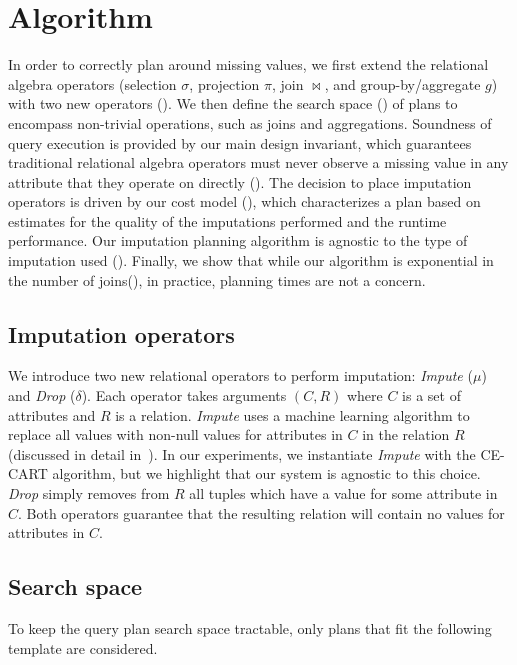\section{Algorithm}
In order to correctly plan around missing values, we first extend the relational algebra operators (selection $\sigma$, projection $\pi$, join $\bowtie$, and group-by/aggregate $g$) 
with two new operators (). We then define the search space () of plans to encompass non-trivial operations, such as joins and 
aggregations. Soundness of query execution is provided by our main design invariant, which guarantees traditional relational
algebra operators must never observe a missing value in any attribute that they operate on directly (). 
The decision to place imputation operators is driven by our cost model (), which characterizes a plan based on estimates for the 
quality of the imputations performed and the runtime performance. Our imputation planning algorithm is
agnostic to the type of imputation used (). Finally, we show
that while our algorithm is exponential in the number of joins(), in practice, planning times are not a concern.


\subsection{Imputation operators}
\label{sec:operators}
We introduce two new relational operators to perform imputation: \textit{Impute} ($\mu$) and
\textit{Drop} ($\delta$). Each operator takes arguments $(C, R)$ where $C$ is a set of
attributes and $R$ is a relation. \textit{Impute} uses a machine learning algorithm to
replace all \nullv{} values with non-null values for attributes in $C$ in the relation $R$ (discussed in detail in~).
In our experiments, we instantiate \textit{Impute} with the CE-CART\cite{burgette2010multiple} algorithm, but we highlight that
our system is agnostic to this choice.
\textit{Drop} simply removes from $R$ all tuples which have a \nullv{} value for some attribute in $C$.
Both operators guarantee that the resulting relation will contain no \nullv{} values for
attributes in $C$.  

\subsection{Search space}
\label{sec:search-space}
To keep the query plan search space tractable, only plans that fit the following template are considered.

